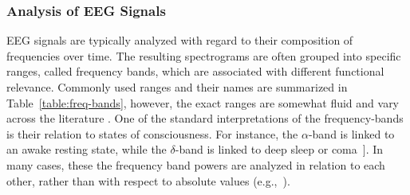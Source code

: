 \subsubsection{Analysis of EEG Signals}
EEG signals are typically analyzed with regard to their composition of frequencies over time.
The resulting spectrograms are often grouped into specific ranges, called frequency bands,
which are associated with different functional relevance.
Commonly used ranges and their names are summarized in Table~\ref{table:freq-bands},
however, the exact ranges are somewhat fluid and vary across the literature
\cite{mecarelli_clinical_2019, purdon_electroencephalogram_2013, appleton_quantitative_2019}.
One of the standard interpretations of the frequency-bands is their relation to states of consciousness.
For instance, the $\alpha$-band is linked to an awake resting state,
while the $\delta$-band is linked to deep sleep or coma~\cite{chen_resting_2020, thomas_relationship_2014}].
In many cases, these the frequency band powers are analyzed in relation to each
other,
rather than with respect to absolute values (e.g.,~\cite{shin_monitoring_2020}).


